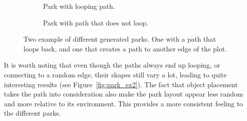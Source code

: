\begin{figure}[H]
  \centering
  \begin{subfigure}[b]{0.4\textwidth}
    \caption{Park with looping path.}
  \end{subfigure}
  \quad
  \begin{subfigure}[b]{0.4\textwidth}
    \caption{Park with path that does not loop.}
  \end{subfigure}
  \caption{Two example of different generated parks. One with a path that loops back, and one that creates a path to another edge of the plot.}
  \label{fig:parks}
\end{figure}
 
It is worth noting that even though the paths always end up looping, or connecting to a random edge, their shapes still vary a lot, leading to quite interesting results (see Figure~\ref{fig:park_ex2}).
The fact that object placement takes the path into consideration also make the park layout appear less random and more relative to its environment. 
This provides a more consistent feeling to the different parks.
 
